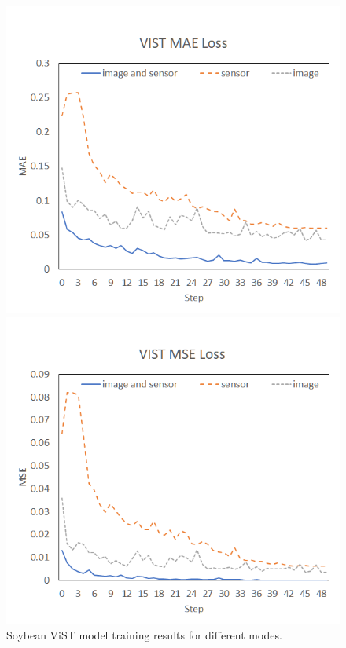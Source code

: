 \documentclass[acmsmall,manuscript, screen, review]{acmart}
\begin{document}
  \begin{figure}[htbp]
    \centering
    \begin{minipage}{0.49\linewidth}
      \centering
      \includegraphics[width=\linewidth]{pic/res_soybean_vist_mae.png}
    \end{minipage}
    \centering
    \begin{minipage}{0.49\linewidth}
      \centering
      \includegraphics[width=\linewidth]{pic/res_soybean_vist_mse.png}
    \end{minipage}
  
    \caption{Soybean ViST model training results for different modes. \label{Soybean_ViST_results}}
  \end{figure}
\end{document}

